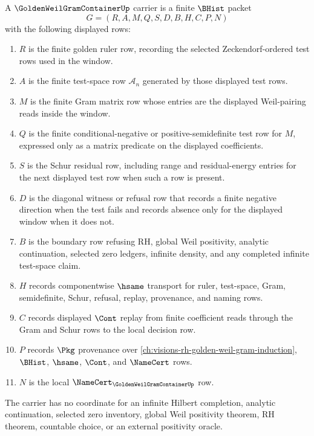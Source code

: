 \begin{definition}
\label{def:golden-weil-gram-container-carrier}
A $\GoldenWeilGramContainerUp$ carrier is a finite $\BHist$ packet
$$
G=(R,A,M,Q,S,D,B,H,C,P,N)
$$
with the following displayed rows:
\begin{enumerate}
\item $R$ is the finite golden ruler row, recording the selected Zeckendorf-ordered test rows used in the window.
\item $A$ is the finite test-space row $\mathcal A_n$ generated by those displayed test rows.
\item $M$ is the finite Gram matrix row whose entries are the displayed Weil-pairing reads inside the window.
\item $Q$ is the finite conditional-negative or positive-semidefinite test row for $M$, expressed only as a matrix predicate on the displayed coefficients.
\item $S$ is the Schur residual row, including range and residual-energy entries for the next displayed test row when such a row is present.
\item $D$ is the diagonal witness or refusal row that records a finite negative direction when the test fails and records absence only for the displayed window when it does not.
\item $B$ is the boundary row refusing RH, global Weil positivity, analytic continuation, selected zero ledgers, infinite density, and any completed infinite test-space claim.
\item $H$ records componentwise $\hsame$ transport for ruler, test-space, Gram, semidefinite, Schur, refusal, replay, provenance, and naming rows.
\item $C$ records displayed $\Cont$ replay from finite coefficient reads through the Gram and Schur rows to the local decision row.
\item $P$ records $\Pkg$ provenance over \autoref{ch:visions-rh-golden-weil-gram-induction}, $\BHist$, $\hsame$, $\Cont$, and $\NameCert$ rows.
\item $N$ is the local $\NameCert_{\GoldenWeilGramContainerUp}$ row.
\end{enumerate}
The carrier has no coordinate for an infinite Hilbert completion, analytic continuation, selected zero inventory, global Weil positivity theorem, RH theorem, countable choice, or an external positivity oracle.
\end{definition}

